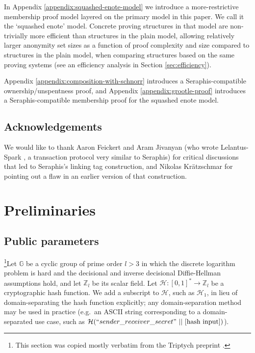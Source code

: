 In Appendix \ref{appendix:squashed-enote-model} we introduce a more-restrictive membership proof model layered on the primary model in this paper. We call it the `squashed enote' model. Concrete proving structures in that model are non-trivially more efficient than structures in the plain model, allowing relatively larger anonymity set sizes as a function of proof complexity and size compared to structures in the plain model, when comparing structures based on the same proving systems (see an efficiency analysis in Section \ref{sec:efficiency}).

Appendix \ref{appendix:composition-with-schnorr} introduces a Seraphis-compatible ownership/unspentness proof, and Appendix \ref{appendix:grootle-proof} introduces a Seraphis-compatible membership proof for the squashed enote model.



\subsection{Acknowledgements}
\label{subsec:intro-acknowledgements}

We would like to thank Aaron Feickert and Aram Jivanyan (who wrote Lelantus-Spark \cite{lelantus-spark}, a transaction protocol very similar to Seraphis) for critical discussions that led to Seraphis's linking tag construction, and Nikolas Kr{\"{a}}tzschmar for pointing out a flaw in an earlier version of that construction.



\section{Preliminaries}
\label{sec:preliminaries}

\subsection{Public parameters}
\label{subsec:preliminaries-public-parameters}

\footnote{This section was copied mostly verbatim from the Triptych preprint \cite{triptych-preprint}.}Let $\mathbb{G}$ be a cyclic group of prime order $l > 3$ in which the discrete logarithm problem is hard and the decisional and inverse decisional Diffie-Hellman assumptions hold, and let $\mathbb{Z}_l$ be its scalar field. Let $\mathcal{H}: [0,1]^* \to \mathbb{Z}_l$ be a cryptographic hash function. We add a subscript to $\mathcal{H}$, such as $\mathcal{H}_1$, in lieu of domain-separating the hash function explicitly; any domain-separation method may be used in practice (e.g.\ an ASCII string corresponding to a domain-separated use case, such as $\mathcal{H}(``sender\_receiver\_secret"\ ||\ [\textrm{hash input}])$).

